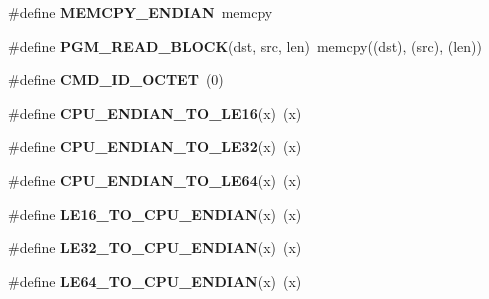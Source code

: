 \begin{DoxyCompactItemize}
\item 
\hypertarget{group__group__sam0__utils_ga85a7d71a016789b1766f9b27d0530347}{}\#define {\bfseries M\+E\+M\+C\+P\+Y\+\_\+\+E\+N\+D\+I\+A\+N}~memcpy\label{group__group__sam0__utils_ga85a7d71a016789b1766f9b27d0530347}

\item 
\hypertarget{group__group__sam0__utils_ga8900e4615b7d7143a6c38e2a39087538}{}\#define {\bfseries P\+G\+M\+\_\+\+R\+E\+A\+D\+\_\+\+B\+L\+O\+C\+K}(dst,  src,  len)~memcpy((dst), (src), (len))\label{group__group__sam0__utils_ga8900e4615b7d7143a6c38e2a39087538}

\item 
\hypertarget{group__group__sam0__utils_gabf2b95fa77301377cdcf79eb615551db}{}\#define {\bfseries C\+M\+D\+\_\+\+I\+D\+\_\+\+O\+C\+T\+E\+T}~(0)\label{group__group__sam0__utils_gabf2b95fa77301377cdcf79eb615551db}

\item 
\hypertarget{group__group__sam0__utils_ga7c15ca0f3159182efc4b80a00768c2c0}{}\#define {\bfseries C\+P\+U\+\_\+\+E\+N\+D\+I\+A\+N\+\_\+\+T\+O\+\_\+\+L\+E16}(x)~(x)\label{group__group__sam0__utils_ga7c15ca0f3159182efc4b80a00768c2c0}

\item 
\hypertarget{group__group__sam0__utils_gaa2fd4bfb7af44220ce4205e2aa371017}{}\#define {\bfseries C\+P\+U\+\_\+\+E\+N\+D\+I\+A\+N\+\_\+\+T\+O\+\_\+\+L\+E32}(x)~(x)\label{group__group__sam0__utils_gaa2fd4bfb7af44220ce4205e2aa371017}

\item 
\hypertarget{group__group__sam0__utils_ga6f1e86f452c8f327f9ca96cbf6a65c81}{}\#define {\bfseries C\+P\+U\+\_\+\+E\+N\+D\+I\+A\+N\+\_\+\+T\+O\+\_\+\+L\+E64}(x)~(x)\label{group__group__sam0__utils_ga6f1e86f452c8f327f9ca96cbf6a65c81}

\item 
\hypertarget{group__group__sam0__utils_gaceb02fdef243c22d2559e260185fb579}{}\#define {\bfseries L\+E16\+\_\+\+T\+O\+\_\+\+C\+P\+U\+\_\+\+E\+N\+D\+I\+A\+N}(x)~(x)\label{group__group__sam0__utils_gaceb02fdef243c22d2559e260185fb579}

\item 
\hypertarget{group__group__sam0__utils_ga2df63369ef525ba98832132ce5a43346}{}\#define {\bfseries L\+E32\+\_\+\+T\+O\+\_\+\+C\+P\+U\+\_\+\+E\+N\+D\+I\+A\+N}(x)~(x)\label{group__group__sam0__utils_ga2df63369ef525ba98832132ce5a43346}

\item 
\hypertarget{group__group__sam0__utils_gab675071ce5a4644b205cdbc858417ccd}{}\#define {\bfseries L\+E64\+\_\+\+T\+O\+\_\+\+C\+P\+U\+\_\+\+E\+N\+D\+I\+A\+N}(x)~(x)\label{group__group__sam0__utils_gab675071ce5a4644b205cdbc858417ccd}


\end{DoxyCompactItemize}

